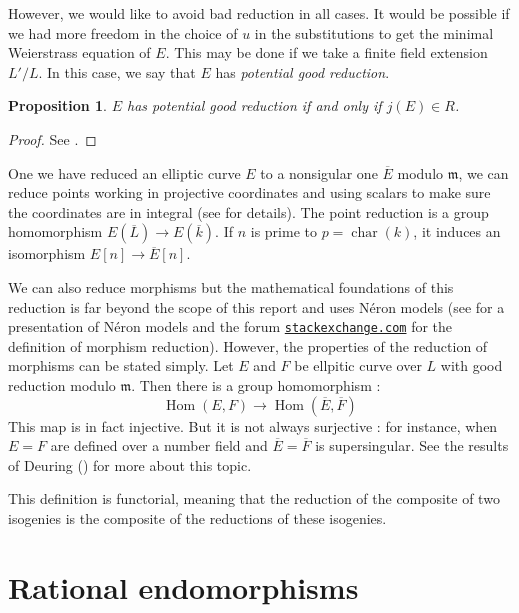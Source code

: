 \documentclass[a4paper,10pt]{report}
\theoremstyle{definition}
\theoremstyle{plain}
\newtheorem{proposition}[definition]{Proposition}
\theoremstyle{definition}
\renewcommand{\(}{\left(}
\renewcommand{\)}{\right)}
\newcommand{\mfm}{\mathfrak{m}}
\DeclareMathOperator{\Hom}{Hom}
\DeclareMathOperator{\Char}{char}%
\begin{document}
However,  we would like to avoid bad reduction in all cases.  It would be possible if we had more freedom in the choice of $u$ in the substitutions to get the minimal Weierstrass equation of $E$.  This may be done if we take a finite field extension $L'/L$.  In this case, we say that $E$ has \emph{potential good reduction}.

\begin{proposition}\label{proposition 1}
$E$ has potential good reduction if and only if $j(E)\in R$. 
\end{proposition}

\begin{proof}
See \cite[proposition VII.5.5]{Silverman1}.
\end{proof}

One we have reduced an elliptic curve $E$ to a nonsigular one $\overline{E}$ modulo $\mfm$,  we can reduce points working in projective coordinates and using scalars to make sure the coordinates are in integral (see \cite[VII.2 and VII.3]{Silverman1} for details).  The point reduction is a group homomorphism $E(\overline{L})\longrightarrow E(\overline{k})$.  If $n$ is prime to $p=\Char(k)$,  it induces an isomorphism $E[n]\longrightarrow \overline{E}[n]$.  

We can also reduce morphisms but the mathematical foundations of this reduction is far beyond the scope of this report and uses N\'{e}ron models (see \cite[chapter IV]{Silverman2} for a presentation of N\'{e}ron models and the forum \href{https://math.stackexchange.com/questions/2352060/definition-of-the-natural-reduction-map-tilde-phi-for-phie-1-to-e-2-an}{\protect\Verb+stackexchange.com+} for the definition of morphism reduction).  However,  the properties of the reduction of morphisms can be stated simply.  Let $E$ and $F$ be ellpitic curve over $L$ with good reduction modulo $\mfm$.  Then there is a group homomorphism :
\[\Hom(E,F)\longrightarrow\Hom(\overline{E},\overline{F})\]
This map is in fact injective.  But it is not always surjective : for instance,  when $E=F$ are defined over a number field and $\overline{E}=\overline{F}$ is supersingular.  See the results of Deuring (\cite[chapter 13]{Lang_EF}) for more about this topic.   

This definition is functorial,  meaning that the reduction of the composite of two isogenies is the composite of the reductions of these isogenies.  

\section{Rational endomorphisms}
\end{document}
